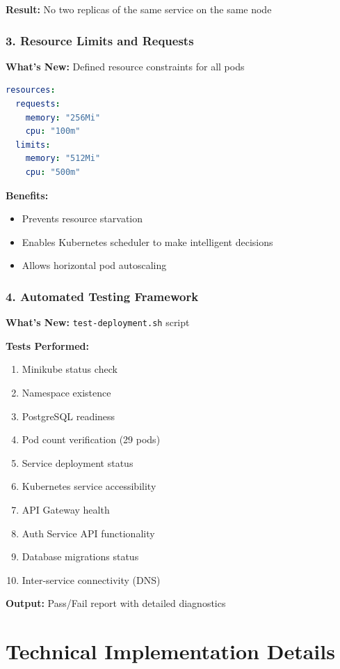 \documentclass[12pt,a4paper]{article}
\begin{document}
\textbf{Result:} No two replicas of the same service on the same node

\subsubsection{3. Resource Limits and Requests}
\textbf{What's New:} Defined resource constraints for all pods

\begin{lstlisting}[language=yaml]
resources:
  requests:
    memory: "256Mi"
    cpu: "100m"
  limits:
    memory: "512Mi"
    cpu: "500m"
\end{lstlisting}

\textbf{Benefits:}
\begin{itemize}
    \item Prevents resource starvation
    \item Enables Kubernetes scheduler to make intelligent decisions
    \item Allows horizontal pod autoscaling
\end{itemize}

\subsubsection{4. Automated Testing Framework}
\textbf{What's New:} \texttt{test-deployment.sh} script

\textbf{Tests Performed:}
\begin{enumerate}
    \item Minikube status check
    \item Namespace existence
    \item PostgreSQL readiness
    \item Pod count verification (29 pods)
    \item Service deployment status
    \item Kubernetes service accessibility
    \item API Gateway health
    \item Auth Service API functionality
    \item Database migrations status
    \item Inter-service connectivity (DNS)
\end{enumerate}

\textbf{Output:} Pass/Fail report with detailed diagnostics

\section{Technical Implementation Details}
\end{document}
